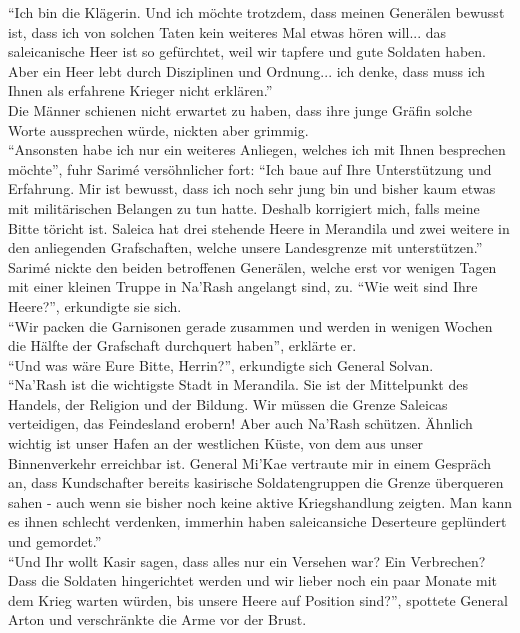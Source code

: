 ``Ich bin die Klägerin. Und ich möchte trotzdem, dass meinen Generälen bewusst ist, dass ich von 
solchen Taten kein weiteres Mal etwas hören will... das saleicanische Heer ist so gefürchtet, weil 
wir tapfere und gute Soldaten haben. Aber ein Heer lebt durch Disziplinen und Ordnung... ich denke, 
dass muss ich Ihnen als erfahrene Krieger nicht erklären.''\\
Die Männer schienen nicht erwartet zu haben, dass ihre junge Gräfin solche Worte aussprechen würde, 
nickten aber grimmig.\\
``Ansonsten habe ich nur ein weiteres Anliegen, welches ich mit Ihnen besprechen möchte'', fuhr 
Sarimé versöhnlicher fort: ``Ich baue auf Ihre Unterstützung und Erfahrung. Mir ist bewusst, dass 
ich noch sehr jung bin und bisher kaum etwas mit militärischen Belangen zu tun hatte. Deshalb 
korrigiert mich, falls meine Bitte töricht ist. Saleica hat drei stehende Heere in Merandila und 
zwei weitere in den anliegenden Grafschaften, welche unsere Landesgrenze mit unterstützen.''\\
Sarimé nickte den beiden betroffenen Generälen, welche erst vor wenigen Tagen mit einer kleinen 
Truppe in Na'Rash angelangt sind, zu. ``Wie weit sind Ihre Heere?'', erkundigte sie sich.\\
``Wir packen die Garnisonen gerade zusammen und werden in wenigen Wochen die Hälfte der Grafschaft 
durchquert haben'', erklärte er.\\
``Und was wäre Eure Bitte, Herrin?'', erkundigte sich General Solvan.\\
``Na'Rash ist die wichtigste Stadt in Merandila. Sie ist der Mittelpunkt des Handels, der Religion 
und der Bildung. Wir müssen die Grenze Saleicas verteidigen, das Feindesland erobern! Aber auch 
Na'Rash schützen. Ähnlich wichtig ist unser Hafen an der westlichen Küste, von dem aus unser 
Binnenverkehr erreichbar ist. General Mi'Kae vertraute mir in einem Gespräch an, dass Kundschafter 
bereits kasirische Soldatengruppen die Grenze überqueren sahen - auch wenn sie bisher noch keine 
aktive Kriegshandlung zeigten. Man kann es ihnen schlecht verdenken, immerhin haben saleicansiche 
Deserteure geplündert und gemordet.''\\
``Und Ihr wollt Kasir sagen, dass alles nur ein Versehen war? Ein Verbrechen? Dass die Soldaten 
hingerichtet werden und wir lieber noch ein paar Monate mit dem Krieg warten würden, bis unsere 
Heere auf Position sind?'', spottete General Arton und verschränkte die Arme vor der Brust.\\
